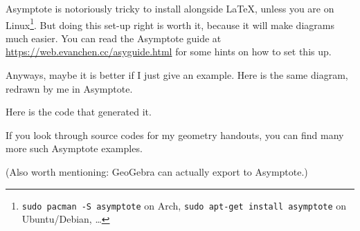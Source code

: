 \documentclass[11pt]{scrartcl}
\begin{document}
Asymptote is notoriously tricky to install alongside \LaTeX,
unless you are on Linux\footnote{\texttt{sudo pacman -S asymptote} on Arch,
\texttt{sudo apt-get install asymptote} on Ubuntu/Debian, \dots}.
But doing this set-up right is worth it,
because it will make diagrams much easier.
You can read the Asymptote guide at
\url{https://web.evanchen.cc/asyguide.html}
for some hints on how to set this up.

Anyways, maybe it is better if I just give an example.
Here is the same diagram, redrawn by me in Asymptote.
\begin{center}
\end{center}
Here is the code that generated it.


If you look through source codes for my geometry handouts,
you can find many more such Asymptote examples.

(Also worth mentioning: GeoGebra can actually export to Asymptote.)
\end{document}
